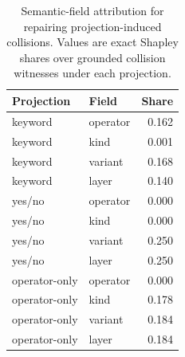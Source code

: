 \begin{table}[t]
\centering
\caption{Semantic-field attribution for repairing projection-induced collisions. Values are exact Shapley shares over grounded collision witnesses under each projection.}
\label{tab:shapley}
\small
\begin{tabular}{llr}
\toprule
Projection & Field & Share \\
\midrule
keyword & operator & 0.162 \\
keyword & kind & 0.001 \\
keyword & variant & 0.168 \\
keyword & layer & 0.140 \\
\midrule
yes/no & operator & 0.000 \\
yes/no & kind & 0.000 \\
yes/no & variant & 0.250 \\
yes/no & layer & 0.250 \\
\midrule
operator-only & operator & 0.000 \\
operator-only & kind & 0.178 \\
operator-only & variant & 0.184 \\
operator-only & layer & 0.184 \\
\bottomrule
\end{tabular}
\end{table}
